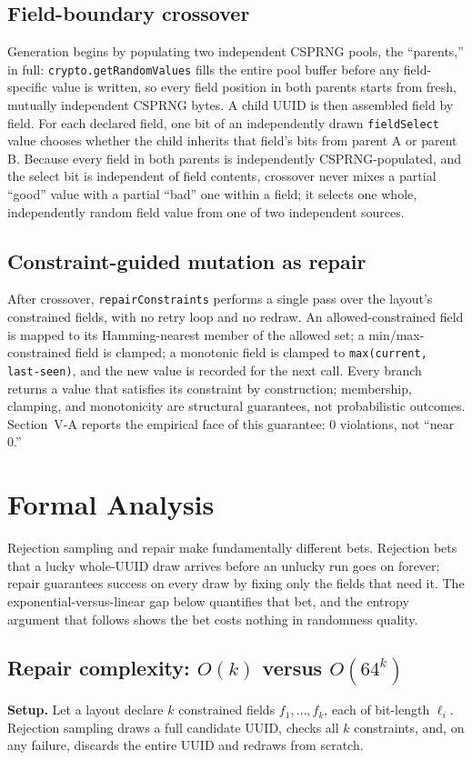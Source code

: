 \documentclass[conference]{IEEEtran}
\begin{document}
\subsection{Field-boundary crossover}
Generation begins by populating two independent CSPRNG pools, the ``parents,'' in full: \texttt{crypto.getRandomValues} fills the entire pool buffer before any field-specific value is written, so every field position in both parents starts from fresh, mutually independent CSPRNG bytes. A child UUID is then assembled field by field. For each declared field, one bit of an independently drawn \texttt{fieldSelect} value chooses whether the child inherits that field's bits from parent A or parent B. Because every field in both parents is independently CSPRNG-populated, and the select bit is independent of field contents, crossover never mixes a partial ``good'' value with a partial ``bad'' one within a field; it selects one whole, independently random field value from one of two independent sources.

\subsection{Constraint-guided mutation as repair}
After crossover, \texttt{repairConstraints} performs a single pass over the layout's constrained fields, with no retry loop and no redraw. An allowed-constrained field is mapped to its Hamming-nearest member of the allowed set; a min/max-constrained field is clamped; a monotonic field is clamped to \texttt{max(current, last-seen)}, and the new value is recorded for the next call. Every branch returns a value that satisfies its constraint by construction; membership, clamping, and monotonicity are structural guarantees, not probabilistic outcomes. Section~V-A reports the empirical face of this guarantee: 0 violations, not ``near 0.''

\section{Formal Analysis}
Rejection sampling and repair make fundamentally different bets. Rejection bets that a lucky whole-UUID draw arrives before an unlucky run goes on forever; repair guarantees success on every draw by fixing only the fields that need it. The exponential-versus-linear gap below quantifies that bet, and the entropy argument that follows shows the bet costs nothing in randomness quality.

\subsection{Repair complexity: $O(k)$ versus $O(64^k)$}
\textbf{Setup.} Let a layout declare $k$ constrained fields $f_1, \dots, f_k$, each of bit-length $\ell_i$. Rejection sampling draws a full candidate UUID, checks all $k$ constraints, and, on any failure, discards the entire UUID and redraws from scratch.
\end{document}
